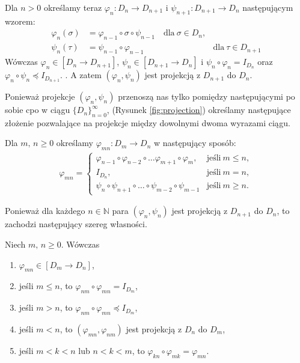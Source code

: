 Dla \(n>0\) określamy teraz \(\varphi_n : D_n \to D_{n+1}\) i \(\psi_{n+1}: D_{n+1}\to D_n\) następującym wzorem:
\begin{align*}
  \varphi_n(\sigma) &= \varphi_{n-1}\circ\sigma\circ\psi_{n-1}\quad \text{dla}\ \sigma\in D_n,\\ 
  \psi_n(\tau) &= \psi_{n-1}\circ\varphi_{n-1}\quad &\text{dla}\ \tau \in D_{n+1}
\end{align*}
Wówczas \(\varphi_n\in[D_n\to D_{n+1}]\), \(\psi_n\in[D_{n+1}\to D_n]\) i \(\psi_n\circ\varphi_n=I_{D_n}\) oraz \(\varphi_n\circ\psi_n\preceq I_{D_{n+1}}.\) \cite[Lemat 16.28]{Hindley:2008:LCI:1388400}. A zatem \((\varphi_n,\psi_n)\) jest projekcją z \(D_{n+1}\) do \(D_n\).

Ponieważ projekcje \((\varphi_n, \psi_n)\) przenoszą nas tylko pomiędzy następującymi po sobie cpo w ciągu \(\{D_n\}_{n=0}^\infty\), (Rysunek \ref{fig:projection}) określamy następujące złożenie pozwalające na projekcje między dowolnymi dwoma wyrazami ciągu.

\begin{definicja}%
Dla \(m,\,n\geq 0\) określamy \(\varphi_{mn}:D_m \to D_n\) w następujący sposób:
\begin{align*}
\varphi_{mn} =
\begin{cases}
\varphi_{n-1} \circ \varphi_{n-2} \circ \dots \varphi_{m+1} \circ \varphi_m, & \text{jeśli}\ m\leq n,\\
I_{D_n}, & \text{jeśli}\ m=n,\\
\psi_n \circ \psi_{n+1} \circ \dots \circ \psi_{m-2}\circ \psi_{m-1} & \text{jeśli}\ m\geq n.
\end{cases}
\end{align*}
\end{definicja}

Ponieważ dla każdego \(n\in \mathbb{N}\) para \((\varphi_n, \psi_n)\) jest projekcją z \(D_{n+1}\) do \(D_n\), to zachodzi następujący szereg własności.

\begin{fakt}%
Niech \(m,\,n\geq 0\). Wówczas
\begin{enumerate}[label={(\roman*)}, ref={(\roman*)}] 
  \setlength\itemsep{0em}
\item \(\varphi_{mn}\in [D_m\to D_n]\),
\item jeśli \(m\leq n\), to \(\varphi_{nm}\circ \varphi_{mn} = I_{D_m}\),
\item jeśli \(m>n\), to \(\varphi_{nm}\circ \varphi_{mn} \preceq I_{D_m}\),
\item jeśli \(m<n\), to \((\varphi_{mn},\varphi_{nm})\) jest projekcją z \(D_n\) do \(D_m\),
\item jeśli \(m<k<n\) lub \(n<k<m\), to \(\varphi_{kn}\circ\varphi_{mk}=\varphi_{mn}\).
\end{enumerate}
\end{fakt}

